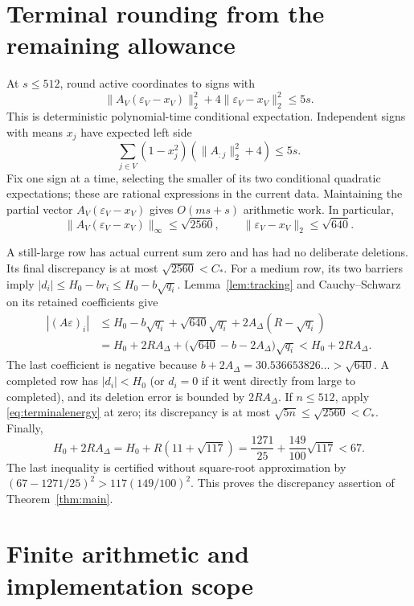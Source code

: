 \documentclass[11pt]{amsart}
\theoremstyle{remark}\newtheorem{remark}[theorem]{Remark}
\newcommand{\eps}{\varepsilon}
\begin{document}
\section{Terminal rounding from the remaining allowance}\label{sec:terminal}

At $s\le512$, round active coordinates to signs with
\begin{equation}\label{eq:terminalenergy}
 \|A_V(\eps_V-x_V)\|_2^2+4\|\eps_V-x_V\|_2^2\le5s.
\end{equation}
This is deterministic polynomial-time conditional expectation.
Independent signs with means $x_j$ have expected left side
\[
 \sum_{j\in V}(1-x_j^2)(\|A_{:j}\|_2^2+4)\le5s.
\]
Fix one sign at a time, selecting the smaller of its two conditional
quadratic expectations; these are rational expressions in the current
data. Maintaining the partial vector $A_V(\eps_V-x_V)$ gives $O(ms+s)$
arithmetic work. In particular,
\begin{equation}\label{eq:roundnorms}
 \|A_V(\eps_V-x_V)\|_\infty\le\sqrt{2560},\qquad
 \|\eps_V-x_V\|_2\le\sqrt{640}.
\end{equation}

A still-large row has actual current sum zero and has had no deliberate
deletions. Its final discrepancy is at most $\sqrt{2560}<C_*$.
For a medium row, its two barriers imply
$|d_i|\le H_0-br_i\le H_0-b\sqrt{q_i}$.
Lemma~\ref{lem:tracking} and Cauchy--Schwarz on its retained coefficients
give
\begin{align*}
 |(A\eps)_i|
 &\le H_0-b\sqrt{q_i}
        +\sqrt{640}\sqrt{q_i}
        +2A_\Delta(R-\sqrt{q_i})\\
 &=H_0+2RA_\Delta
       +\bigl(\sqrt{640}-b-2A_\Delta\bigr)\sqrt{q_i}
 <H_0+2RA_\Delta.
\end{align*}
The last coefficient is negative because
$b+2A_\Delta=30.536653826\ldots>\sqrt{640}$.
A completed row has $|d_i|<H_0$ (or $d_i=0$ if it went directly from large
to completed), and its deletion error is bounded by $2RA_\Delta$.
If $n\le512$, apply \eqref{eq:terminalenergy} at zero; its discrepancy is
at most $\sqrt{5n}\le\sqrt{2560}<C_*$.
Finally,
\[
 H_0+2RA_\Delta=H_0+R(11+\sqrt{117})
 =\frac{1271}{25}+\frac{149}{100}\sqrt{117}<67.
\]
The last inequality is certified without square-root approximation by
$(67-1271/25)^2>117(149/100)^2$.
This proves the discrepancy assertion of Theorem~\ref{thm:main}.

\section{Finite arithmetic and implementation scope}\label{sec:arithmetic}
\end{document}
